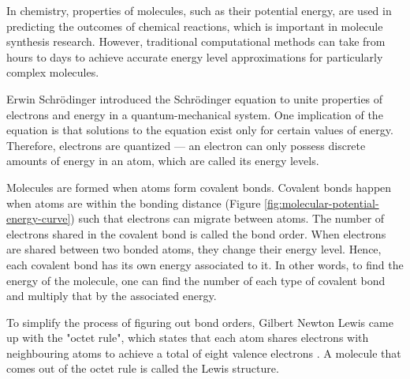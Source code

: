 In chemistry, properties of molecules, such as their potential energy, are used in predicting the outcomes of chemical reactions, which is important in molecule synthesis research. However, traditional computational methods can take from hours to days to achieve accurate energy level approximations for particularly complex molecules.

Erwin Schrödinger introduced the Schrödinger equation to unite properties of electrons and energy in a quantum-mechanical system. One implication of the equation is that solutions to the equation exist only for certain values of energy. Therefore, electrons are quantized --- an electron can only possess discrete amounts of energy in an atom, which are called its energy levels.

Molecules are formed when atoms form covalent bonds. Covalent bonds happen when atoms are within the bonding distance (Figure \ref{fig:molecular-potential-energy-curve}) such that electrons can migrate between atoms. The number of electrons shared in the covalent bond is called the bond order. When electrons are shared between two bonded atoms, they change their energy level. Hence, each covalent bond has its own energy associated to it. In other words, to find the energy of the molecule, one can find the number of each type of covalent bond and multiply that by the associated energy.

\begin{Figure}
    \centering
    
    \captionsetup{width=.9\linewidth}
    \label{fig:molecular-potential-energy-curve}
\end{Figure}

To simplify the process of figuring out bond orders, Gilbert Newton Lewis came up with the "octet rule", which states that each atom shares electrons with neighbouring atoms to achieve a total of eight valence electrons \cite{inorganicChem}. A molecule that comes out of the octet rule is called the Lewis structure.

